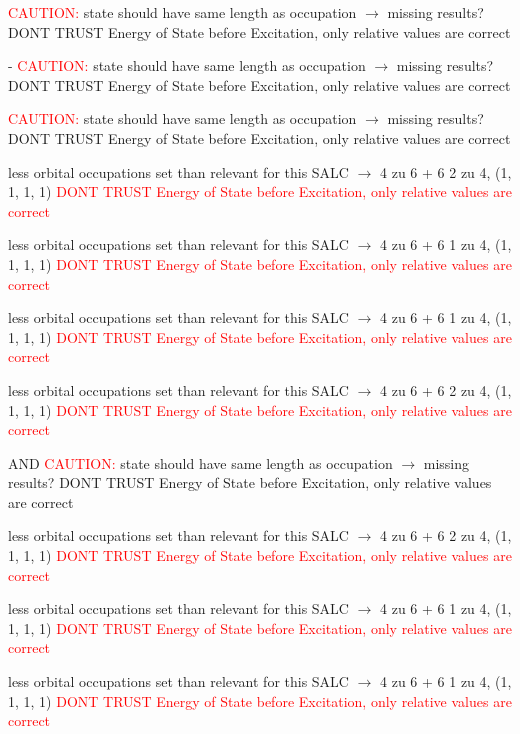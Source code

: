 \documentclass[12pt,a4paper]{article}
\begin{document}
	\textcolor{red}{CAUTION:} state should have same length as occupation $\rightarrow$ missing results?
	DONT TRUST \glqq{}Energy of State before Excitation\grqq{}, only relative values are correct

 - 	\textcolor{red}{CAUTION:} state should have same length as occupation $\rightarrow$ missing results?
	DONT TRUST \glqq{}Energy of State before Excitation\grqq{}, only relative values are correct

	\textcolor{red}{CAUTION:} state should have same length as occupation $\rightarrow$ missing results?
	DONT TRUST \glqq{}Energy of State before Excitation\grqq{}, only relative values are correct

less orbital occupations set than relevant for this SALC $\rightarrow$ 
4 zu 6 + 6 
2 zu 4, (1, 1, 1, 1) 
\textcolor{red}{DONT TRUST \glqq{}Energy of State before Excitation\grqq{}, only relative values are correct}

less orbital occupations set than relevant for this SALC $\rightarrow$ 
4 zu 6 + 6 
1 zu 4, (1, 1, 1, 1) 
\textcolor{red}{DONT TRUST \glqq{}Energy of State before Excitation\grqq{}, only relative values are correct}

less orbital occupations set than relevant for this SALC $\rightarrow$ 
4 zu 6 + 6 
1 zu 4, (1, 1, 1, 1) 
\textcolor{red}{DONT TRUST \glqq{}Energy of State before Excitation\grqq{}, only relative values are correct}

less orbital occupations set than relevant for this SALC $\rightarrow$ 
4 zu 6 + 6 
2 zu 4, (1, 1, 1, 1) 
\textcolor{red}{DONT TRUST \glqq{}Energy of State before Excitation\grqq{}, only relative values are correct}

 AND 	\textcolor{red}{CAUTION:} state should have same length as occupation $\rightarrow$ missing results?
	DONT TRUST \glqq{}Energy of State before Excitation\grqq{}, only relative values are correct

less orbital occupations set than relevant for this SALC $\rightarrow$ 
4 zu 6 + 6 
2 zu 4, (1, 1, 1, 1) 
\textcolor{red}{DONT TRUST \glqq{}Energy of State before Excitation\grqq{}, only relative values are correct}

less orbital occupations set than relevant for this SALC $\rightarrow$ 
4 zu 6 + 6 
1 zu 4, (1, 1, 1, 1) 
\textcolor{red}{DONT TRUST \glqq{}Energy of State before Excitation\grqq{}, only relative values are correct}

less orbital occupations set than relevant for this SALC $\rightarrow$ 
4 zu 6 + 6 
1 zu 4, (1, 1, 1, 1) 
\textcolor{red}{DONT TRUST \glqq{}Energy of State before Excitation\grqq{}, only relative values are correct}
\end{document}
